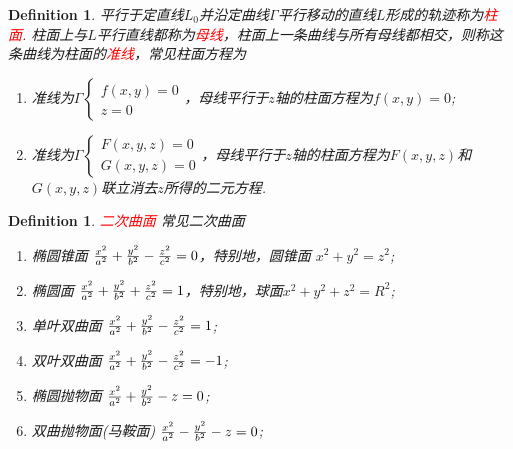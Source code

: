 \documentclass{article}
\newtheorem{definition}[theorem]{Definition}
\newcommand{\redt}[1]{\textcolor{red}{#1}}
\begin{document}
\begin{definition}
\rm 平行于定直线$L_0$并沿定曲线$\Gamma$平行移动的直线$L$形成的轨迹称为\redt{柱面}. 柱面上与$L$平行直线都称为\redt{母线}，柱面上一条曲线与所有母线都相交，则称这条曲线为柱面的\redt{准线}，常见柱面方程为
\begin{enumerate}
	\item 准线为$\Gamma \left\{ \begin{array}{ll} f(x,y) = 0 \\ z = 0 \end{array} \right.$，母线平行于$z$轴的柱面方程为$f(x,y) = 0$;
	\item 准线为$\Gamma \left\{\begin{array}{ll} F(x,y,z) = 0 \\ G(x,y,z) = 0 \end{array}\right.$，母线平行于$z$轴的柱面方程为$F(x,y,z)$和$G(x,y,z)$联立消去$z$所得的二元方程. 
\end{enumerate}
\end{definition}

\begin{definition}
\rm \redt{二次曲面} 常见二次曲面
\begin{enumerate}
	\item 椭圆锥面 ${x^{2} \over a^{2}}+{y^{2} \over b^{2}}-{z^{2} \over c^{2}}=0$，特别地，圆锥面 $x^2 + y^2 = z^2$;
	\item 椭圆面 ${x^{2} \over a^{2}}+{y^{2} \over b^{2}}+{z^{2} \over c^{2}}=1$，特别地，球面$x^2+y^2+z^2 = R^2$;
	\item 单叶双曲面 ${x^{2} \over a^{2}}+{y^{2} \over b^{2}}-{z^{2} \over c^{2}}=1$;
	\item 双叶双曲面 ${x^{2} \over a^{2}}+{y^{2} \over b^{2}}-{z^{2} \over c^{2}}=-1$;
	\item 椭圆抛物面 ${x^{2} \over a^{2}}+{y^{2} \over b^{2}}-z=0$;
	\item 双曲抛物面(马鞍面) ${x^{2} \over a^{2}}-{y^{2} \over b^{2}}-z=0$;
\end{enumerate}
\end{definition}
\end{document}
